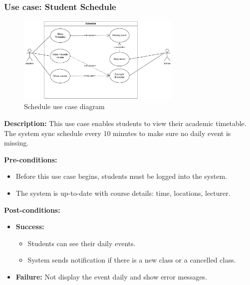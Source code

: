 \documentclass[12pt]{article}
\begin{document}
    

\subsubsection{Use case: Student Schedule}
    \begin{figure}[H]
        \centering
        \includegraphics[width=0.7\textwidth]{image/StudentScheduleUseCase.pdf} 
        \caption{Schedule use case diagram}
        \label{fig:schedule_use_case}
    \end{figure}
    \textbf{Description:} This use case enables students to view their academic timetable. The system sync schedule every 10 minutes to make sure no daily event is missing. \\

    \pagebreak

    \noindent \textbf{Pre-conditions:} 
        \begin{itemize}
            \item Before this use case begins, students must be logged into the system.
            \item The system is up-to-date with course details: time, locations, lecturer.
        \end{itemize}

    \noindent \textbf{Post-conditions:}
    \begin{itemize}
        \item \textbf{Success:} 
        \begin{itemize}
            \item Students can see their daily events.
            \item System sends notification if there is a new class or a cancelled class.
        \end{itemize}
        \item \textbf{Failure:} Not display the event daily and show error messages.
    \end{itemize}
\end{document}
